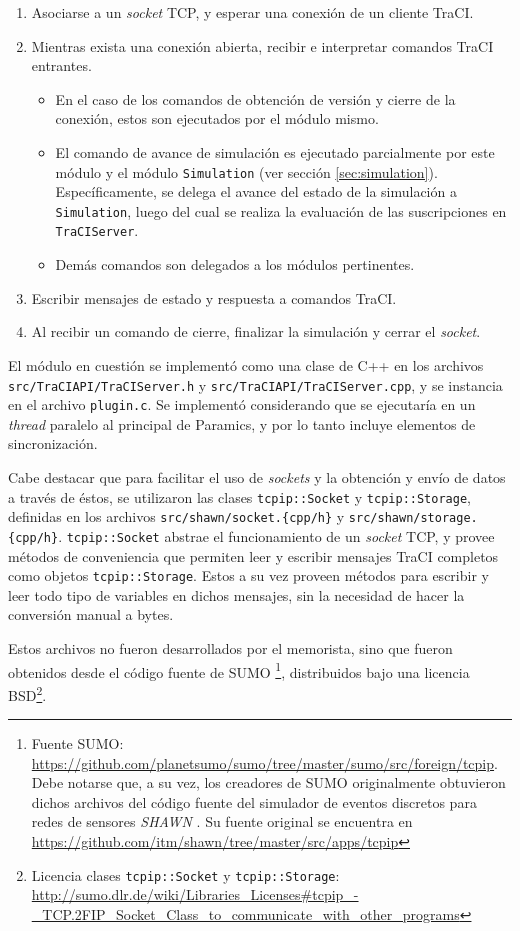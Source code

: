 \begin{enumerate}
    \item Asociarse a un \emph{socket} TCP, y esperar una conexión de un cliente TraCI.
    \item Mientras exista una conexión abierta, recibir e interpretar comandos TraCI entrantes.
    \begin{itemize}
        \item En el caso de los comandos de obtención de versión y cierre de la conexión, estos son ejecutados por el módulo mismo.
        \item El comando de avance de simulación es ejecutado parcialmente por este módulo y el módulo \texttt{Simulation} (ver sección \ref{sec:simulation}). Específicamente, se delega el avance del estado de la simulación a \texttt{Simulation}, luego del cual se realiza la evaluación de las suscripciones en \texttt{TraCIServer}.
        \item Demás comandos son delegados a los módulos pertinentes.
    \end{itemize}
    \item Escribir mensajes de estado y respuesta a comandos TraCI.
    \item Al recibir un comando de cierre, finalizar la simulación y cerrar el \emph{socket}.
\end{enumerate}

El módulo en cuestión se implementó como una clase de C++ en los archivos \texttt{src/TraCIAPI/TraCIServer.h} y \texttt{src/TraCIAPI/TraCIServer.cpp}, y se instancia en el archivo \texttt{plugin.c}. Se implementó considerando que se ejecutaría en un \emph{thread} paralelo al principal de Paramics, y por lo tanto incluye elementos de sincronización.

Cabe destacar que para facilitar el uso de \emph{sockets} y la obtención y envío de datos a través de éstos, se utilizaron las clases \texttt{tcpip::Socket} y \texttt{tcpip::Storage}, definidas en los archivos \texttt{src/shawn/socket.\{cpp/h\}} y \texttt{src/shawn/storage.\{cpp/h\}}. \texttt{tcpip::Socket} abstrae el funcionamiento de un \textit{socket} TCP, y provee métodos de conveniencia que permiten leer y escribir mensajes TraCI completos como objetos \texttt{tcpip::Storage}. Estos a su vez proveen métodos para escribir y leer todo tipo de variables en dichos mensajes, sin la necesidad de hacer la conversión manual a bytes.

Estos archivos no fueron desarrollados por el memorista, sino que fueron obtenidos desde el código fuente de SUMO \footnote{Fuente SUMO: \url{https://github.com/planetsumo/sumo/tree/master/sumo/src/foreign/tcpip}. Debe notarse que, a su vez, los creadores de SUMO originalmente obtuvieron dichos archivos del código fuente del simulador de eventos discretos para redes de sensores \emph{SHAWN} \cite{kroller2005shawn}. Su fuente original se encuentra en \url{https://github.com/itm/shawn/tree/master/src/apps/tcpip}}, distribuidos bajo una licencia BSD\footnote{Licencia clases \texttt{tcpip::Socket} y \texttt{tcpip::Storage}: \url{http://sumo.dlr.de/wiki/Libraries_Licenses\#tcpip_-_TCP.2FIP_Socket_Class_to_communicate_with_other_programs}}.

